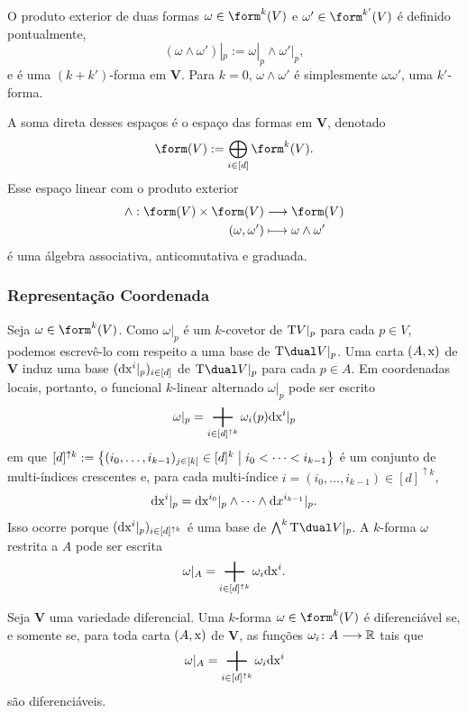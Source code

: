 O produto exterior de duas formas $\omega \in \form^k (V)$ e $\omega' \in \form^{k'} (V)$ é definido pontualmente,
	\begin{equation*}
	(\omega \wedge \omega')|_p := \omega|_p \wedge \omega'|_p,
	\end{equation*}
e é uma $(k+k')$-forma em $\bm V$. Para $k=0$, $\omega \wedge \omega'$ é simplesmente $\omega\omega'$, uma $k'$-forma.

A soma direta desses espaços é o espaço das formas em $\bm V$, denotado
	\begin{equation*}
	\form (V) := \bigoplus_{i \in [d]} \form^k (V).
	\end{equation*}
Esse espaço linear com o produto exterior
	\begin{align*}
	\func{\wedge}{\form (V) \times \form (V)}{\form (V)}{(\omega,\omega')}{\omega \wedge \omega'}
	\end{align*}
é uma álgebra associativa, anticomutativa e graduada.

\subsubsection{Representação Coordenada}

Seja $\omega \in \form^k(V)$. Como $\omega|_p$ é um $k$-covetor de $\mathrm{T} V|_p$ para cada $p \in V$, podemos escrevê-lo com respeito a uma base de $\Tg\dual V|_p$. Uma carta $(A,\mathrm{x})$ de $\bm V$ induz uma base $(\mathrm{d}\mathrm{x}^i|_p)_{i \in [d]}$ de $\Tg\dual V|_p$ para cada $p \in A$. Em coordenadas locais, portanto, o funcional $k$-linear alternado $\omega|_p$ pode ser escrito
	\begin{equation*}
	\omega|_p = \sum_{i \in [d]^{\uparrow k}} \omega_i(p) \dd\x^i|_p
	\end{equation*}
em que $[d]^{\uparrow k} := \left\{(i_0,\ldots,i_{k-1})_{j \in [k]} \in [d]^k \;\middle\vert\; i_0<\cdots<i_{k-1} \right\}$ é um conjunto de multi-índices crescentes e, para cada multi-índice $i=(i_0,\ldots,i_{k-1}) \in [d]^{\uparrow k}$,
	\begin{equation*}
	\mathrm{d}\mathrm{x}^i|_p = \mathrm{d}\mathrm{x}^{i_0}|_p \wedge \cdots \wedge \mathrm{d} x^{i_{k-1}}|_p.
	\end{equation*}
Isso ocorre porque $(\mathrm{d}\mathrm{x}^i|_p)_{i \in [d]^{\uparrow k}}$ é uma base de $\bigwedge^k\Tg\dual V|_p$. A $k$-forma $\omega$ restrita a $A$ pode ser escrita
	\begin{equation*}
	\omega|_A = \sum_{i \in [d]^{\uparrow k}} \omega_i \dd\x^i.
	\end{equation*}

\begin{prop}
Seja $\bm V$ uma variedade diferencial. Uma $k$-forma $\omega \in \form^k(V)$ é diferenciável se, e somente se, para toda carta $(A,\mathrm{x})$ de $\bm V$, as funções $\omega_i\colon A \longrightarrow \mathbb{R}$ tais que
	\begin{equation*}
	\omega|_A = \sum_{i \in [d]^{\uparrow k}} \omega_i \dd\x^i
	\end{equation*}
são diferenciáveis.
\end{prop}

